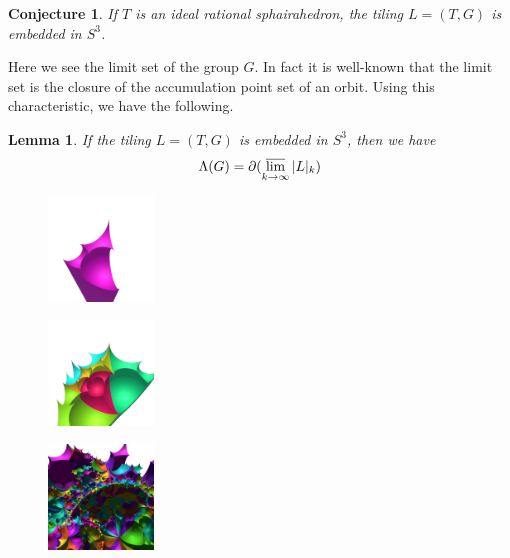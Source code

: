 \documentclass[suppldata, dvipdfmx]{interact}
\theoremstyle{plain}%
\newtheorem{lemma}[theorem]{Lemma}
\newtheorem{conjecture}[theorem]{Conjecture}
\theoremstyle{definition}
\theoremstyle{remark}
\theoremstyle{problemstyle}
\begin{document}
\begin{conjecture}
If $T$ is an ideal rational sphairahedron, the tiling $L=(T,G)$ is embedded in $S^3$.
\end{conjecture}

Here we see the limit set of the group $G$.  In fact it is well-known that the limit set is the closure of the accumulation point set of an orbit.  Using this characteristic, we have the following.

\begin{lemma}
If the tiling $L=(T,G)$ is embedded in $S^3$, then we have
\[
\Lambda(G) =\partial(\varlimsup_{k\to\infty} |L|_k)
\]
\end{lemma}

\begin{figure}[h!tbp]
 \begin{minipage}[t]{0.18\textwidth}
  \centering
  \includegraphics[height=1.1in, keepaspectratio]{./img/constructFractal/terrainProcess/step1.png}
  \label{fig:terrainStep1}
 \end{minipage}
 \hspace*{\fill}
 \begin{minipage}[t]{0.18\textwidth}
  \centering
  \includegraphics[height=1.1in, keepaspectratio]{./img/constructFractal/terrainProcess/step2.png}
  \label{}
 \end{minipage}
 \hspace*{\fill}
 \begin{minipage}[t]{0.18\textwidth}
  \centering
  \includegraphics[height=1.1in, keepaspectratio]{./img/constructFractal/terrainProcess/step5.png}

\end{minipage}
\end{figure}
\end{document}
